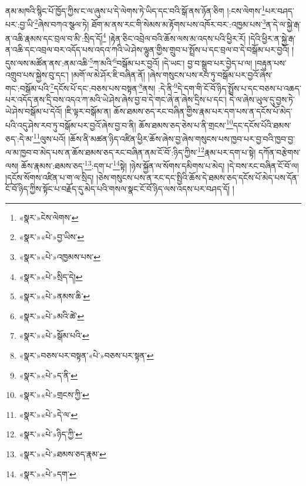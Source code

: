 ནམ་མཁའི་སྙིང་པོ་ཁྱོད་ཀྱིས་ང་ལ་ཞུས་པ་དེ་ལེགས་ཏེ་ཡིད་དང་བའི་སྒོ་ནས་ཉོན་ཅིག །:ངས་ལེགས་\footnote{«སྣར་»ངེས་ལེགས་}པར་བཤད་པར་:བྱ་ཡི་\footnote{«སྣར་»«པེ་»བྱ་ཡིས་}ཞེས་བཀའ་སྩལ་ཏེ། ཐོག་མ་ནས་རང་གི་སེམས་མ་རྟོགས་པས་འཁོར་བར་:འཁྱམ་པས་\footnote{«སྣར་»«པེ་»འཁྱམས་པས་}ན་དེ་ལ་སྐྱེ་རྒ་ན་འཆི་རྣམས་དང་བྲལ་བ་མི་:སྲིད་དོ།\footnote{«སྣར་»«པེ་»སྲིད་དེ།} །རྟེན་ཅིང་འབྲེལ་བའི་ཆོས་ལས་མ་འདས་པའི་ཕྱིར་རོ། །དེའི་ཕྱིར་ན་སྐྱེ་རྒ་ན་འཆི་དང་འབྲལ་བར་འདོད་པས་འདའ་ཀའི་ཡེ་ཤེས་ལྷུན་གྱིས་གྲུབ་པ་སྤྲོས་པ་དང་བྲལ་བ་དེ་བསྒོམ་པར་བྱའོ། །དུས་ལས་མཚོན་ནས་:ནམ་འཆི་\footnote{«སྣར་»«པེ་»ནམས་ཆི་}ཀ་མའི་\footnote{«སྣར་»«པེ་»མའི་ཚེ་}བསྒོམ་པར་བྱའོ། །དེ་ཡང་། བྱ་བ་སྒྲུབ་པར་བྱེད་པ་ལ། །བརྟུན་པས་འགྲུབ་པས་སྐྱེས་བུ་དང་། །མགོ་ལ་མེ་ཤོར་ཇི་བཞིན་ནོ། །ཞེས་གསུངས་པས་རབ་ཏུ་བསྒོམ་པར་བྱའོ་ཞེས་གང་:བསྒོམ་པའི་\footnote{«སྣར་»«པེ་»སྒོམ་པའི་}དངོས་པོ་དང་:བཅས་པས་བསྟན་\footnote{«སྣར་»བཅས་པར་བསྟན་«པེ་»བཅས་པར་སྟན་}ནས། :དེ་ནི་\footnote{«སྣར་»«པེ་»ད་ནི་}དེ་དག་གི་ངོ་བོ་ཉིད་སྤྲོས་པ་དང་བཅས་པ་འཆད་པར་འདོད་ནས་དྲི་བས་འདའ་ཀ་མའི་ཡེ་ཤེས་ཞེས་བྱ་བ་དེ་གང་ཞེ་ན་ཞེས་དྲིས་པ་དང་། དེ་ལ་ཞེས་ཡུལ་དུ་བྱས་ཏེ་ཡེ་ཤེས་བསྒོམ་པ་དེའོ། །ཇི་ལྟར་བསྒོམ་ན། ཆོས་ཐམས་ཅད་རང་བཞིན་གྱིས་རྣམ་པར་དག་པས་ན་དངོས་པོ་མེད་པའི་འདུ་ཤེས་རབ་ཏུ་བསྒོམ་པར་བྱའོ་ཞེས་བྱ་བ་ནི། ཆོས་ཐམས་ཅད་ཅེས་པ་ནི་གྲངས་\footnote{«སྣར་»«པེ་»གྲངས་ཀྱི་}དང་དངོས་པོའི་ཐམས་ཅད་:དེ་མ་\footnote{«སྣར་»«པེ་»དེ་ལ་}ལུས་པའོ། །ཆོས་ནི་མཚན་ཉིད་འཛིན་ཕྱིར་ཆོས་ཞེས་བྱ་ཞེས་གསུངས་པས་ཁྱབ་པར་བྱ་བའི་ཁྱབ་བྱ་ལ་མ་ཁྱབ་བ་མེད་པས་ན་ཆོས་ཐམས་ཅད་རང་བཞིན་ནམ་ངོ་བོ་:ཉིད་ཀྱིས་\footnote{«སྣར་»«པེ་»ཉིད་ཀྱི་}རྣམ་པར་དག་པ་སྟེ། དཀོན་བརྩེགས་ལས། ཆོས་རྣམས་:ཐམས་ཅད་\footnote{«སྣར་»«པེ་»ཐམས་ཅད་རྣམ་}:དག་པ་\footnote{«སྣར་»«པེ་»དག་}སྟེ། །ཉེས་སྐྱོན་ལ་སོགས་དམིགས་པ་མེད། །དེ་བས་རང་བཞིན་ངོ་བོ་ལ། །དངོས་སོགས་འཛིན་པ་ག་ལ་སྲིད། །ཅེས་གསུངས་པས་ན་རང་དང་སྤྱིའི་ཆོས་དེ་ཐམས་ཅད་དངོས་པོ་མེད་པས་དོན་ངོ་བོ་ཉིད་ཀྱིས་སྟོང་པ་བརྗོད་དུ་མེད་པའི་གསལ་སྣང་ངོ་བོ་ཉིད་ལས་འདས་པར་བཤད་དོ། །
